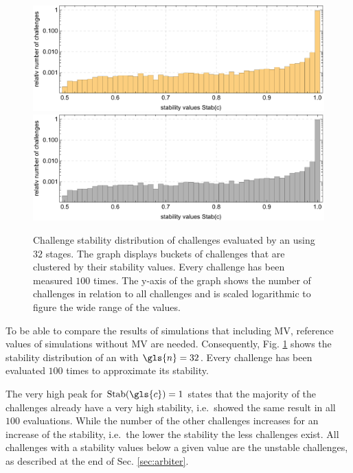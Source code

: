 \begin{figure}[!ht]
\ifx{}\undefined
{}
\else
	\if{}
	\centering
	\includegraphics[width=1.00\textwidth]{images/arbiter-stability-distribution-simulation.pdf}
	\else
	\includegraphics[width=1.00\textwidth]{images/arbiter-stability-distribution-simulation_mono.pdf}
	\fi
\fi
\caption[Challenge stability distribution of an \apuf]{Challenge stability distribution of challenges evaluated by an \apuf using $32$ stages. 
The graph displays buckets of challenges that are clustered by their stability values.
Every challenge has been measured $100$ times. The y-axis of the graph shows the number of challenges in relation to all challenges and is scaled logarithmic to figure the wide range of the values.}  %
\label{fig:arbiterstabilitydistribution}
\end{figure}
\pagebreak

To be able to compare the results of simulations that including \ac{MV}, reference values of \apufs simulations without \ac{MV} are needed.
Consequently, Fig. \ref{fig:arbiterstabilitydistribution} shows the stability distribution of an \apuf with $\gls{n} = 32$.
Every challenge has been evaluated $100$ times to approximate its stability.

The very high peak for $\Stab(\gls{c}) = 1$ states that the majority of the challenges already have a very high stability, i.e.\ showed the same result in all $100$ evaluations.
While the number of the other challenges increases for an increase of the stability, i.e.\ the lower the stability the less challenges exist.
All challenges with a stability values below a given value are the unstable challenges, as described at the end of Sec. \ref{sec:arbiter}.

